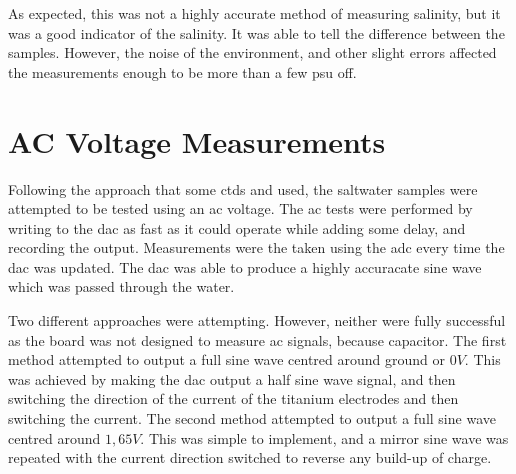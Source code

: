 As expected, this was not a highly accurate method of measuring salinity, but it was a good indicator of the salinity.
It was able to tell the difference between the samples.
However, the noise of the environment, and other slight errors affected the measurements enough to be more than a few \gls{psu} off.

\section{AC Voltage Measurements}

Following the approach that some \glspl{ctd} and  used, the saltwater samples were attempted to be tested using an \gls{ac} voltage.
The \gls{ac} tests were performed by writing to the \gls{dac} as fast as it could operate while adding some delay, and recording the output.
Measurements were the taken using the \gls{adc} every time the \gls{dac} was updated.
The \gls{dac} was able to produce a highly accuracate sine wave which was passed through the water.

Two different approaches were attempting.
However, neither were fully successful as the board was not designed to measure \gls{ac} signals, because capacitor.
The first method attempted to output a full sine wave centred around ground or $0V$.
This was achieved by making the \gls{dac} output a half sine wave signal, and then switching the direction of the current of the titanium electrodes and then switching the current.
The second method attempted to output a full sine wave centred around $1,65V$.
This was simple to implement, and a mirror sine wave was repeated with the current direction switched to reverse any build-up of charge.

